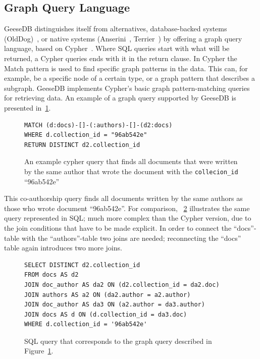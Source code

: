 \subsection{Graph Query Language}
GeeseDB distinguishes itself from alternatives, database-backed systems (OldDog)~\citep{olddog-docker}, or native systems (Anserini~\citep{anserini}, Terrier~\citep{terrier}) by offering a graph query language, based on Cypher~\citep{cypher}. 
Where SQL queries start with what will be returned, a Cypher queries ends with it in the return clause. In Cypher  the Match pattern is used to find specific graph patterns in the data. This can, for example, be a specific node of a certain type, or a graph pattern that describes a subgraph. 
GeeseDB implements Cypher's basic graph pattern-matching queries for retrieving data. An example of a graph query supported by GeeseDB is presented in~\cref{fig:graph_query}.
\begin{figure}
	\begin{verbatim}
MATCH (d:docs)-[]-(:authors)-[]-(d2:docs)
WHERE d.collection_id = "96ab542e"
RETURN DISTINCT d2.collection_id
	\end{verbatim}
	\caption{An example cypher query that finds all documents that were written by the same author that wrote the document with the \texttt{collecion\_id} ``96ab542e''}
	\label{fig:graph_query}
\end{figure}
This co-authorship query finds all documents written by the same authors as those who wrote document ``96ab542e''. For comparison, ~\cref{fig:corresponding_sql} illustrates the same query represented in SQL; much more complex than the Cypher version, due to the join conditions that have to be made explicit. In order to connect the ``docs''-table with the ``authors''-table two joins are needed; reconnecting the ``docs'' table again introduces two more joins.

\begin{figure}
	\begin{verbatim}
SELECT DISTINCT d2.collection_id
FROM docs AS d2
JOIN doc_author AS da2 ON (d2.collection_id = da2.doc)
JOIN authors AS a2 ON (da2.author = a2.author)
JOIN doc_author AS da3 ON (a2.author = da3.author)
JOIN docs AS d ON (d.collection_id = da3.doc)
WHERE d.collection_id = '96ab542e'
	\end{verbatim}
	\caption{SQL query that corresponds to the graph query described in Figure~\ref{fig:graph_query}.}
	\label{fig:corresponding_sql}
\end{figure}

